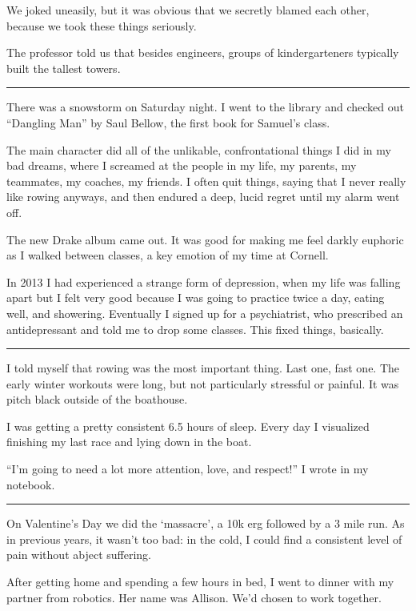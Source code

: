 We joked uneasily, but it was obvious that we secretly blamed each other,
because we took these things seriously.

The professor told us that besides engineers, groups of kindergarteners
typically built the tallest towers.

\plainfancybreak{12pt}{2}{* * *}

There was a snowstorm on Saturday night.   I went to the library and checked out
``Dangling Man'' by Saul Bellow, the first book for Samuel's class.

The main character did all of the unlikable, confrontational things I did in my
bad dreams,  where I screamed at the people in my life, my parents, my
teammates, my coaches, my friends.  I often quit things, saying that I never
really like rowing anyways, and then endured a deep, lucid regret until my alarm
went off.

The new Drake album came out.  It was good for making me feel darkly euphoric as
I walked between classes, a key emotion of my time at Cornell.  

In 2013 I had experienced a strange form of depression, when my life was falling
apart but I felt very good because I was going to practice twice a day, eating
well, and showering.  Eventually I signed up for a psychiatrist, who prescribed
an antidepressant and told me to drop some classes.  This fixed things,
basically. 

\plainfancybreak{12pt}{2}{* * *}

I told myself that rowing was the most important thing.  Last one, fast one.
The early winter workouts were long, but not particularly stressful or painful.
It was pitch black outside of the boathouse.

I was getting a pretty consistent 6.5 hours of sleep.  Every day I visualized
finishing my last race and lying down in the boat.  

``I'm going to need a lot more attention, love, and respect!'' I wrote in my
notebook. 

\plainfancybreak{12pt}{2}{* * *}

On Valentine's Day we did the `massacre', a 10k erg followed by a 3 mile run.
As in previous years, it wasn't too bad: in the cold, I could find a consistent
level of pain without abject suffering.

After getting home and spending a few hours in bed, I went to dinner with my
partner from robotics.  Her name was Allison.  We'd chosen to work together.  

